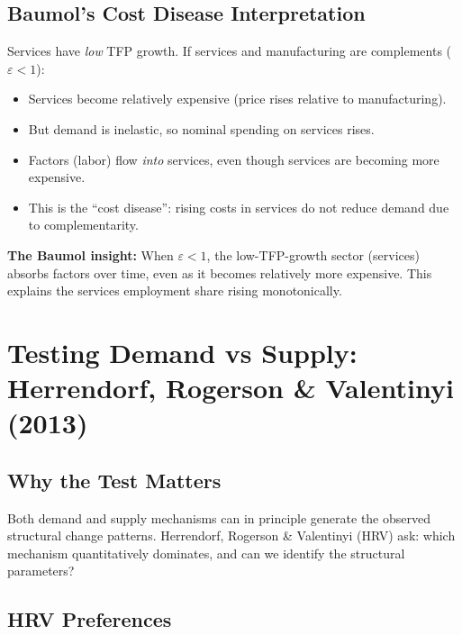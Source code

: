 \documentclass[a4paper,11pt]{article}
\begin{document}
\subsection*{Baumol's Cost Disease Interpretation}

Services have \emph{low} TFP growth. If services and manufacturing are complements ($\varepsilon < 1$):
\begin{itemize}
    \item Services become relatively expensive (price rises relative to manufacturing).
    \item But demand is inelastic, so nominal spending on services rises.
    \item Factors (labor) flow \emph{into} services, even though services are becoming more expensive.
    \item This is the ``cost disease'': rising costs in services do not reduce demand due to complementarity.
\end{itemize}

\begin{tcolorbox}[colback=orange!10,colframe=orange3,title=Key Insight to Memorize]
\textbf{The Baumol insight:} When $\varepsilon < 1$, the low-TFP-growth sector (services) absorbs factors over time, even as it becomes relatively more expensive. This explains the services employment share rising monotonically.
\end{tcolorbox}

\clearpage

\section{Testing Demand vs Supply: Herrendorf, Rogerson \& Valentinyi (2013)}

\subsection*{Why the Test Matters}

Both demand and supply mechanisms can in principle generate the observed structural change patterns. Herrendorf, Rogerson \& Valentinyi (HRV) ask: which mechanism quantitatively dominates, and can we identify the structural parameters?

\subsection*{HRV Preferences}
\end{document}
